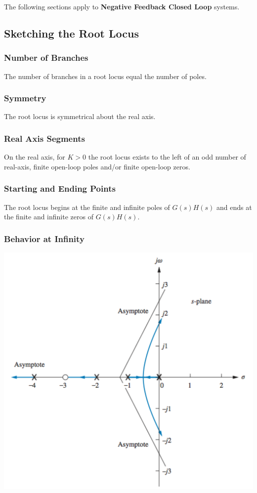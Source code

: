\documentclass[11pt]{article}
\begin{document}
    The following sections apply to \textbf{Negative Feedback Closed Loop} systems.

    \subsection{Sketching the Root Locus}

    \subsubsection{Number of Branches}

    The number of branches in a root locus equal the number of poles.

    \subsubsection{Symmetry}

    The root locus is symmetrical about the real axis.

    \subsubsection{Real Axis Segments}

    On the real axis, for $K > 0$ the root locus exists to the left of an odd number of real-axis, finite open-loop poles and/or finite open-loop zeros.

    \subsubsection{Starting and Ending Points}

    The root locus begins at the finite and infinite poles of $G(s)H(s)$ and ends at the finite and infinite zeros of $G(s)H(s)$.

    \subsubsection{Behavior at Infinity}

    \begin{center}
    \includegraphics[width=300 px]{img/asymptotes} \\
    \end{center}
\end{document}
